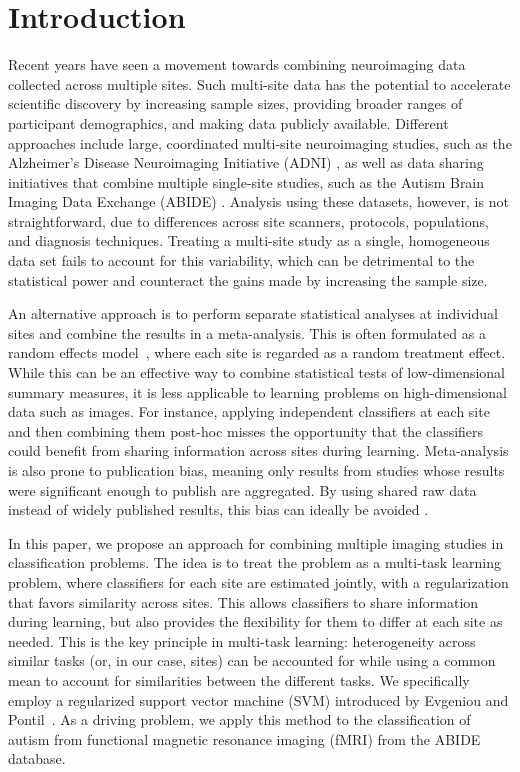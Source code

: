 \documentclass{llncs}
\begin{document}
\section{Introduction}
Recent years have seen a movement towards combining neuroimaging data collected
across multiple sites. Such multi-site data has the potential to accelerate
scientific discovery by increasing sample sizes, providing broader ranges of
participant demographics, and making data publicly available. Different
approaches include large, coordinated multi-site neuroimaging studies, such as
the Alzheimer's Disease Neuroimaging Initiative (ADNI) \cite{adni}, as well as
data sharing initiatives that combine multiple single-site studies, such as the
Autism Brain Imaging Data Exchange (ABIDE) \cite{abide}. Analysis using these
datasets, however, is not straightforward, due to differences across site
scanners, protocols, populations, and diagnosis techniques. Treating a
multi-site study as a single, homogeneous data set fails to account for this
variability, which can be detrimental to the statistical power and counteract
the gains made by increasing the sample size.

An alternative approach is to perform separate statistical analyses at
individual sites and combine the results in a meta-analysis. This is often
formulated as a random effects model~\cite{DerSimonian}, where each site is
regarded as a random treatment effect. While this can be an effective way to
combine statistical tests of low-dimensional summary measures, it is less
applicable to learning problems on high-dimensional data such as images. For
instance, applying independent classifiers at each site and then combining them
post-hoc misses the opportunity that the classifiers could benefit from sharing
information across sites during learning.  Meta-analysis is also prone to publication bias, meaning only results from 
studies whose results were significant enough to publish are aggregated.  By using shared raw data instead of widely 
published results, this bias can ideally be avoided \cite{meta}. 

In this paper, we propose an approach for combining multiple imaging studies in
classification problems. The idea is to treat the problem as a multi-task
learning problem, where classifiers for each site are estimated jointly, with a
regularization that favors similarity across sites. This allows classifiers to
share information during learning, but also provides the flexibility for them to
differ at each site as needed. This is the key principle in multi-task learning:
heterogeneity across similar tasks (or, in our case, sites) can be accounted for
while using a common mean to account for similarities between the different
tasks. We specifically employ a regularized support vector machine (SVM)
introduced by Evgeniou and Pontil~\cite{regMTL}. As a driving problem, we
apply this method to the classification of autism from functional magnetic
resonance imaging (fMRI) from the ABIDE database.
\end{document}
